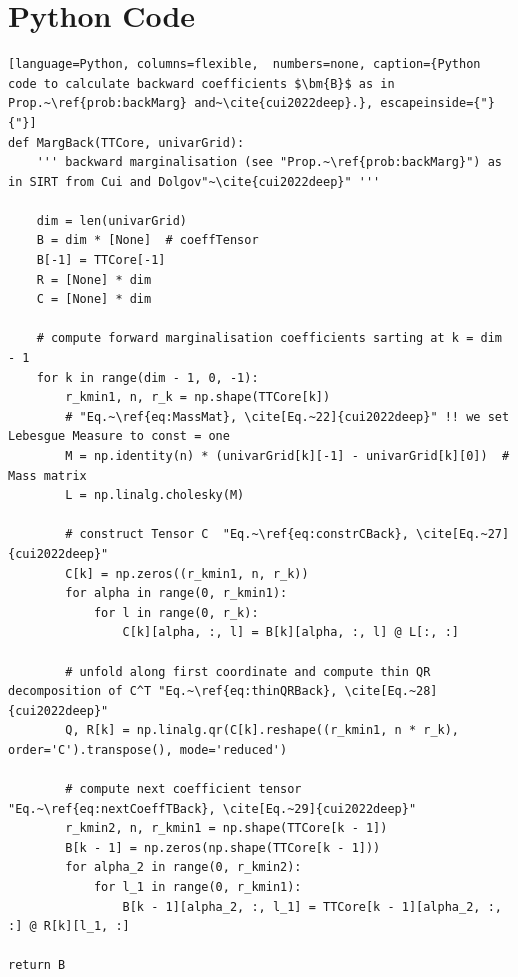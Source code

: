 \section{Python Code}
\label{sec:PythonCode}

\begin{lstlisting}[language=Python, columns=flexible,  numbers=none, caption={Python code to calculate backward coefficients $\bm{B}$ as in Prop.~\ref{prob:backMarg} and~\cite{cui2022deep}.}, escapeinside={"}{"}]
def MargBack(TTCore, univarGrid):
	''' backward marginalisation (see "Prop.~\ref{prob:backMarg}") as in SIRT from Cui and Dolgov"~\cite{cui2022deep}" '''
	
	dim = len(univarGrid)
	B = dim * [None]  # coeffTensor
	B[-1] = TTCore[-1]
	R = [None] * dim
	C = [None] * dim
	
	# compute forward marginalisation coefficients sarting at k = dim - 1
	for k in range(dim - 1, 0, -1):
		r_kmin1, n, r_k = np.shape(TTCore[k])
		# "Eq.~\ref{eq:MassMat}, \cite[Eq.~22]{cui2022deep}" !! we set Lebesgue Measure to const = one
		M = np.identity(n) * (univarGrid[k][-1] - univarGrid[k][0])  # Mass matrix
		L = np.linalg.cholesky(M)
		
		# construct Tensor C  "Eq.~\ref{eq:constrCBack}, \cite[Eq.~27]{cui2022deep}"
		C[k] = np.zeros((r_kmin1, n, r_k))
		for alpha in range(0, r_kmin1):
			for l in range(0, r_k):
				C[k][alpha, :, l] = B[k][alpha, :, l] @ L[:, :]
		
		# unfold along first coordinate and compute thin QR decomposition of C^T "Eq.~\ref{eq:thinQRBack}, \cite[Eq.~28]{cui2022deep}"
		Q, R[k] = np.linalg.qr(C[k].reshape((r_kmin1, n * r_k), order='C').transpose(), mode='reduced')
		
		# compute next coefficient tensor "Eq.~\ref{eq:nextCoeffTBack}, \cite[Eq.~29]{cui2022deep}"
		r_kmin2, n, r_kmin1 = np.shape(TTCore[k - 1])
		B[k - 1] = np.zeros(np.shape(TTCore[k - 1]))
		for alpha_2 in range(0, r_kmin2):
			for l_1 in range(0, r_kmin1):
				B[k - 1][alpha_2, :, l_1] = TTCore[k - 1][alpha_2, :, :] @ R[k][l_1, :]

return B

\end{lstlisting}
\clearpage
\clearpage
